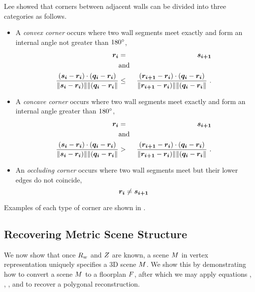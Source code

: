 Lee \etal \cite{Lee09} showed that corners between adjacent walls
can be divided into three categories as follows.
\begin{itemize}
  \item{A \textit{convex corner} occurs where two wall segments meet
    exactly and form an internal angle not greater than $180\degrees$, \ie
    \begin{eqnarray}
      \vect{r_i} &=& \vect{s_{i+1}}\\
      &\mbox{and}&\\
      \frac{(\vect{s_i}-\vect{r_i})\cdot(\vect{q_i}-\vect{r_i})}
           {\|\vect{s_i}-\vect{r_i})\|\|(\vect{q_i}-\vect{r_i}\|}
      &\leq&
      \frac{(\vect{r_{i+1}}-\vect{r_i})\cdot(\vect{q_i}-\vect{r_i})}
           {\|\vect{r_{i+1}}-\vect{r_i})\|\|(\vect{q_i}-\vect{r_i}\|} ~.
    \end{eqnarray}
  }
  \item{A \textit{concave corner} occurs where two wall segments meet
    exactly and form an internal angle greater than $180\degrees$, \ie
    \begin{eqnarray}
      \vect{r_i} &=& \vect{s_{i+1}}\\
      &\mbox{and}&\\
      \frac{(\vect{s_i}-\vect{r_i})\cdot(\vect{q_i}-\vect{r_i})}
           {\|\vect{s_i}-\vect{r_i})\|\|(\vect{q_i}-\vect{r_i}\|}
      &>&
      \frac{(\vect{r_{i+1}}-\vect{r_i})\cdot(\vect{q_i}-\vect{r_i})}
           {\|\vect{r_{i+1}}-\vect{r_i})\|\|(\vect{q_i}-\vect{r_i}\|} ~.
    \end{eqnarray}
  }
  \item{An \textit{occluding corner} occurs where two wall segments
    meet but their lower edges do not coincide, \ie
    \begin{equation}
      \vect{r_i} \neq \vect{s_{i+1}}
    \end{equation}
  }
\end{itemize}
Examples of each type of corner are shown in .

\subsection{Recovering Metric Scene Structure}
\label{sec:metric-recovery}

We now show that once $\SceneR$ and $\Zs$ are known, a scene $\Scene$
in vertex representation uniquely specifies a 3D scene
$\Reconstruction$. We show this by demonstrating how to convert a
scene $\Scene$ to a floorplan $\Floorplan$, after which we may apply
equations , , , and  to
recover a polygonal reconstruction.

